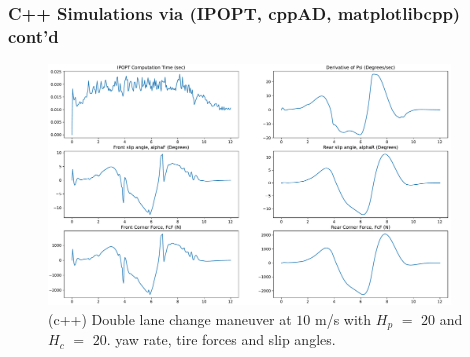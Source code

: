 \documentclass{beamer}
\begin{document}
\begin{frame}
	\frametitle{C++ Simulations via (IPOPT, cppAD, matplotlibcpp) cont'd}
	\begin{figure}
		\centering
		\includegraphics[width=0.95\textwidth,keepaspectratio]{images/Double_Lane_Change_Maneuver_cpp_02.pdf}
		\caption{(c++) Double lane change maneuver at $10$ m/s with $H_p$ $=$ $20$ and $H_c$ $=$ $20$. yaw rate, tire forces and slip angles.}
		\label{fig_11:double_lane_change_maneuver_02}
	\end{figure}
\end{frame}
\end{document}

